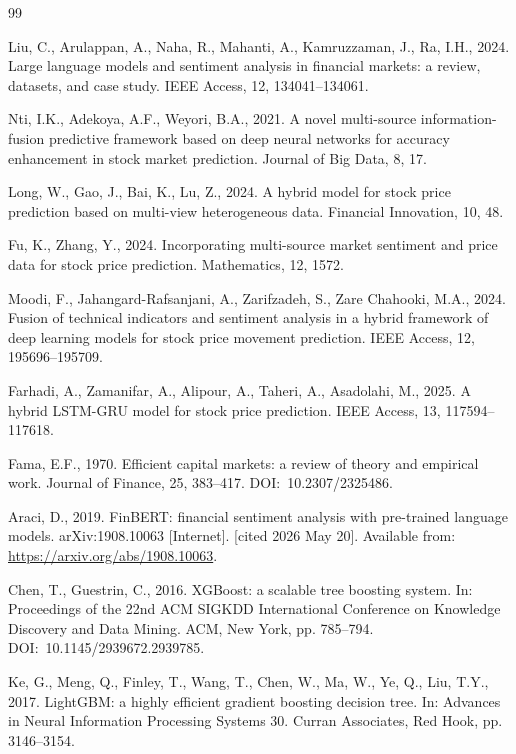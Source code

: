 \documentclass[12pt,a4paper]{article}
\begin{document}
\begin{singlespace}
\begin{thebibliography}{99}
\setlength{\itemsep}{0pt}
\setlength{\parskip}{0pt}

Liu, C., Arulappan, A., Naha, R., Mahanti, A., Kamruzzaman, J., Ra, I.H., 2024.
Large language models and sentiment analysis in financial markets: a review,
datasets, and case study. IEEE Access, 12, 134041--134061.

Nti, I.K., Adekoya, A.F., Weyori, B.A., 2021. A novel multi-source
information-fusion predictive framework based on deep neural networks for accuracy
enhancement in stock market prediction. Journal of Big Data, 8, 17.

Long, W., Gao, J., Bai, K., Lu, Z., 2024. A hybrid model for stock price prediction
based on multi-view heterogeneous data. Financial Innovation, 10, 48.

Fu, K., Zhang, Y., 2024. Incorporating multi-source market sentiment and price data
for stock price prediction. Mathematics, 12, 1572.

Moodi, F., Jahangard-Rafsanjani, A., Zarifzadeh, S., Zare Chahooki, M.A., 2024.
Fusion of technical indicators and sentiment analysis in a hybrid framework of deep
learning models for stock price movement prediction. IEEE Access, 12,
195696--195709.

Farhadi, A., Zamanifar, A., Alipour, A., Taheri, A., Asadolahi, M., 2025. A hybrid
LSTM-GRU model for stock price prediction. IEEE Access, 13, 117594--117618.

Fama, E.F., 1970. Efficient capital markets: a review of theory and empirical work.
Journal of Finance, 25, 383--417. \mbox{DOI: 10.2307/2325486.}

Araci, D., 2019. FinBERT: financial sentiment analysis with pre-trained language
models. arXiv:1908.10063 [Internet]. [cited 2026 May 20]. Available from:
\url{https://arxiv.org/abs/1908.10063}.

Chen, T., Guestrin, C., 2016. XGBoost: a scalable tree boosting system. In:
Proceedings of the 22nd ACM SIGKDD International Conference on Knowledge Discovery
and Data Mining. ACM, New York, pp. 785--794. \mbox{DOI: 10.1145/2939672.2939785.}

Ke, G., Meng, Q., Finley, T., Wang, T., Chen, W., Ma, W., Ye, Q., Liu, T.Y., 2017.
LightGBM: a highly efficient gradient boosting decision tree. In: Advances in
Neural Information Processing Systems 30. Curran Associates, Red Hook, pp.
3146--3154.


\end{thebibliography}
\end{singlespace}
\end{document}
